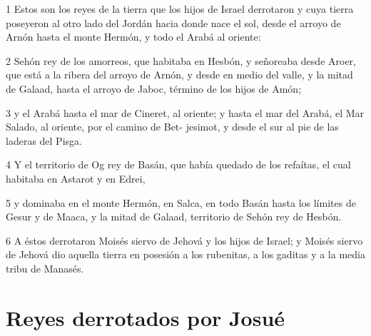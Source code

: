 \par 1 Estos son los reyes de la tierra que los hijos de Israel derrotaron y cuya tierra poseyeron al otro lado del Jordán hacia donde nace el sol, desde el arroyo de Arnón hasta el monte Hermón, y todo el Arabá al oriente:
\par 2 Sehón rey de los amorreos, que habitaba en Hesbón, y señoreaba desde Aroer, que está a la ribera del arroyo de Arnón, y desde en medio del valle, y la mitad de Galaad, hasta el arroyo de Jaboc, término de los hijos de Amón;
\par 3 y el Arabá hasta el mar de Cineret, al oriente; y hasta el mar del Arabá, el Mar Salado, al oriente, por el camino de Bet- jesimot, y desde el sur al pie de las laderas del Pisga.
\par 4 Y el territorio de Og rey de Basán, que había quedado de los refaítas, el cual habitaba en Astarot y en Edrei, 
\par 5 y dominaba en el monte Hermón, en Salca, en todo Basán hasta los límites de Gesur y de Maaca, y la mitad de Galaad, territorio de Sehón rey de Hesbón. 
\par 6 A éstos derrotaron Moisés siervo de Jehová y los hijos de Israel; y Moisés siervo de Jehová dio aquella tierra en posesión a los rubenitas, a los gaditas y a la media tribu de Manasés.

\section*{Reyes derrotados por Josué}


